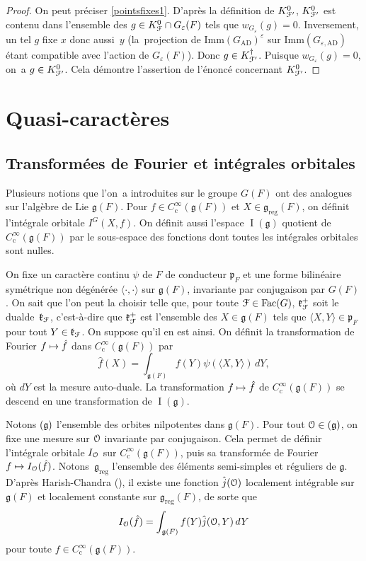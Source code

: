 \documentclass[11pt]{article}
\numberwithin{equation}{section}\providecommand{\og}{«\,}\providecommand{\fg}{\,»}
\let\mathcal \EuScript
\newcommand{\NoChangel}[1]{%
\expandafter\let\csname old\string#1\endcsname=#1
\let#1=\relax
\newcommand{#1}{\mathcode`l="716C\csname old\string#1\endcsname\mathcode`l="7160 }%
}
\let\epsilon\varepsilon
\let\<\langle
\let\>\rangle
\newcommand\mto{\mathchoice{\longmapsto}{\mapsto}{\mapsto}{\mapsto}}
\newcommand{\frg}{\mathfrak{g}}
\newcommand{\frk}{\mathfrak{k}}
\newcommand{\frp}{\mathfrak{p}}
\newcommand{\AD}{\mathrm{AD}}
\newcommand{\rc}{\mathrm{c}}
\newcommand{\Fac}{\mathrm{Fac}}
\newcommand{\Imm}{\mathrm{Imm}}
\newcommand{\Nil}{\mathrm{Nil}} \NoChangel{\Nil}
\newcommand{\reg}{\mathrm{reg}}
\DeclareMathOperator{\rI}{I}
\newcommand{\cF}{\mathcal{F}}
\newcommand{\cO}{\mathcal{O}}
\theoremstyle{plain}
\theoremstyle{definition}
\begin{document}
\begin{proof}
On peut préciser \eqref{pointsfixes1}. D'après la définition de $K_{\cF'}^0$, $K_{\cF'}^0$ est contenu dans l'ensemble des $g\in K_{\cF}^0\cap G_{\epsilon}(F) $ tels que $w_{G_{\epsilon}}(g)=0$. Inversement, un tel $g$ fixe $x$ donc aussi~$y$ (la~projection de $\Imm(G_{\AD})^{\epsilon}$ sur $\Imm(G_{\epsilon,\AD})$ étant compatible avec l'action de $G_{\epsilon}(F)$). Donc $g\in K_{\cF'}^{\dag}$. Puisque $w_{G_{\epsilon}}(g)=0$, on~a $g\in K_{\cF'}^0$. Cela démontre l'assertion de l'énoncé concernant $K_{\cF'}^0$.
\end{proof}

\section{Quasi-caractères}
\subsection{Transformées de Fourier et intégrales orbitales}\label{transformees}
Plusieurs notions que l'on~a introduites sur le groupe $G(F)$ ont des analogues sur l'algèbre de Lie $\frg(F)$. Pour $f\in C_{\rc}^{\infty}(\frg(F))$ et $X\in \frg_{\reg}(F)$, on définit l'intégrale orbitale $I^G(X,f)$. On définit aussi l'espace $\rI(\frg)$ quotient de $C_{\rc}^{\infty}(\frg(F))$ par le sous-espace des fonctions dont toutes les intégrales orbitales sont nulles.

On fixe un caractère continu $\psi$ de $F$ de conducteur $\frp_{F}$ et une forme bilinéaire symétrique non dégénérée $\<{\cdot},{\cdot}\>$ sur $\frg(F)$, invariante par conjugaison par $G(F)$. On sait que l'on peut la choisir telle que, pour toute $\cF\in \Fac(G)$, $\frk_{\cF}^+$ soit le \og dual\fg de~$\frk_{\cF}$, c'est-à-dire que $\frk_{\cF}^+$ est l'ensemble des $X\in \frg(F)$ tels que $\<X,Y\>\in \frp_{F}$ pour tout $Y\in \frk_{\cF}$. On suppose qu'il en est ainsi. On définit la transformation de Fourier $f\mto \hat{f}$ dans $C_{\rc}^{\infty}(\frg(F))$ par
\[
\hat{f}(X)=\int_{\frg(F)}f(Y)\psi(\<X,Y\>)\,dY,
\]
où $dY$ est la mesure auto-duale. La transformation $f\mto \hat{f}$ de $C_{\rc}^{\infty}(\frg(F))$ se descend en une transformation de $\rI(\frg)$.

Notons $\Nil(\frg)$ l'ensemble des orbites nilpotentes dans $\frg(F)$. Pour tout $\cO\in \Nil(\frg)$, on fixe une mesure sur $\cO$ invariante par conjugaison. Cela permet de définir l'inté\-grale orbitale $I_{\cO}$ sur $C_{\rc}^{\infty}(\frg(F))$, puis sa transformée de Fourier $f\mto I_{\cO}(\hat{f})$. \hbox{Notons}~$\frg_{\reg}$ l'ensemble des éléments semi-simples et réguliers de $\frg$. D'après Harish-Chandra (\hbox{\cite[Th.\,4.4]{HC}}), il existe une fonction $\hat{j}(\cO)$ localement intégrable sur $\frg(F)$ et localement constante sur $\frg_{\reg}(F)$, de sorte que
\[
I_{\cO}(\hat{f})=\int_{\frg(F)}f(Y)\hat{j}(\cO,Y)\,dY
\]
pour toute $f\in C_{\rc}^{\infty}(\frg(F))$.
\end{document}

